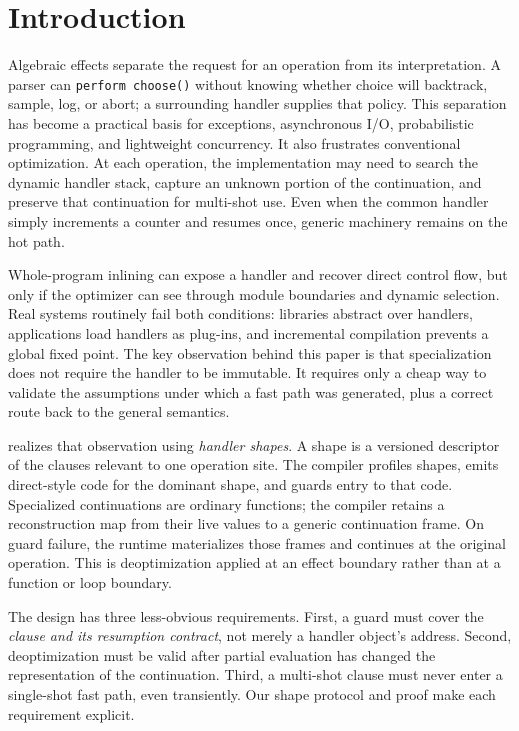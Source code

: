 \section{Introduction}
\label{sec:introduction}

Algebraic effects separate the request for an operation from its
interpretation. A parser can \lstinline|perform choose()| without knowing
whether choice will backtrack, sample, log, or abort; a surrounding handler
supplies that policy. This separation has become a practical basis for
exceptions, asynchronous I/O, probabilistic programming, and lightweight
concurrency. It also frustrates conventional optimization. At each operation,
the implementation may need to search the dynamic handler stack, capture an
unknown portion of the continuation, and preserve that continuation for
multi-shot use. Even when the common handler simply increments a counter and
resumes once, generic machinery remains on the hot path.

Whole-program inlining can expose a handler and recover direct control flow,
but only if the optimizer can see through module boundaries and dynamic
selection. Real systems routinely fail both conditions: libraries abstract
over handlers, applications load handlers as plug-ins, and incremental
compilation prevents a global fixed point. The key observation behind this
paper is that specialization does not require the handler to be immutable. It
requires only a cheap way to validate the assumptions under which a fast path
was generated, plus a correct route back to the general semantics.

\system realizes that observation using \emph{handler shapes}. A shape is a
versioned descriptor of the clauses relevant to one operation site. The
compiler profiles shapes, emits direct-style code for the dominant shape, and
guards entry to that code. Specialized continuations are ordinary functions;
the compiler retains a reconstruction map from their live values to a generic
continuation frame. On guard failure, the runtime materializes those frames and
continues at the original operation. This is deoptimization
\cite{holzle1992debugging,fluckiger2018correctness} applied at an effect
boundary rather than at a function or loop boundary.

The design has three less-obvious requirements. First, a guard must cover the
\emph{clause and its resumption contract}, not merely a handler object's
address. Second, deoptimization must be valid after partial evaluation has
changed the representation of the continuation. Third, a multi-shot clause
must never enter a single-shot fast path, even transiently. Our shape protocol
and proof make each requirement explicit.

